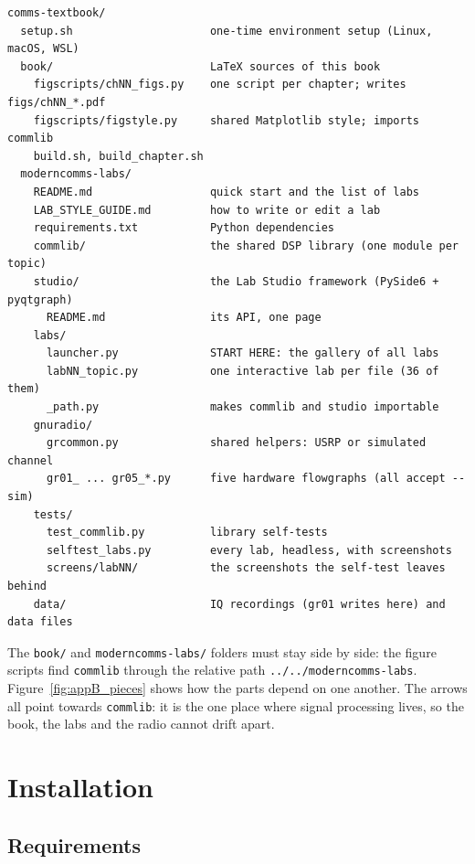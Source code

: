 \begin{lstlisting}[language={}]
comms-textbook/
  setup.sh                     one-time environment setup (Linux, macOS, WSL)
  book/                        LaTeX sources of this book
    figscripts/chNN_figs.py    one script per chapter; writes figs/chNN_*.pdf
    figscripts/figstyle.py     shared Matplotlib style; imports commlib
    build.sh, build_chapter.sh
  moderncomms-labs/
    README.md                  quick start and the list of labs
    LAB_STYLE_GUIDE.md         how to write or edit a lab
    requirements.txt           Python dependencies
    commlib/                   the shared DSP library (one module per topic)
    studio/                    the Lab Studio framework (PySide6 + pyqtgraph)
      README.md                its API, one page
    labs/
      launcher.py              START HERE: the gallery of all labs
      labNN_topic.py           one interactive lab per file (36 of them)
      _path.py                 makes commlib and studio importable
    gnuradio/
      grcommon.py              shared helpers: USRP or simulated channel
      gr01_ ... gr05_*.py      five hardware flowgraphs (all accept --sim)
    tests/
      test_commlib.py          library self-tests
      selftest_labs.py         every lab, headless, with screenshots
      screens/labNN/           the screenshots the self-test leaves behind
    data/                      IQ recordings (gr01 writes here) and data files
\end{lstlisting}

The \texttt{book/} and \texttt{moderncomms-labs/} folders must stay side by side: the figure scripts
find \texttt{commlib} through the relative path \texttt{../../moderncomms-labs}.
Figure~\ref{fig:appB_pieces} shows how the parts depend on one another. The arrows all point
towards \texttt{commlib}: it is the one place where signal processing lives, so the book, the labs
and the radio cannot drift apart.

\section{Installation}
\label{sec:appB:install}

\subsection{Requirements}

